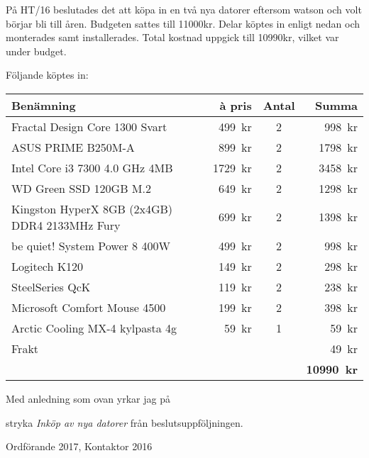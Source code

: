\documentclass[../_main/handlingar.tex]{subfiles}
\begin{document}
På HT/16 beslutades det att köpa in en två nya datorer eftersom watson och volt börjar bli till åren. Budgeten sattes till 11000kr. Delar köptes in enligt nedan och monterades samt installerades. Total kostnad uppgick till 10990kr, vilket var under budget.

Följande köptes in:
\begin{table}[H]
\begin{tabular}{lrcr}
    \textbf{Benämning} & \textbf{\`a pris} & \textbf{Antal} & \textbf{Summa} \\
    \hline
    Fractal Design Core 1300 Svart & \SI{499}{kr} & 2 & \SI{998}{kr} \\
    ASUS PRIME B250M-A & \SI{899}{kr} & 2 & \SI{1798}{kr} \\
    Intel Core i3 7300 4.0 GHz 4MB & \SI{1729}{kr} & 2 & \SI{3458}{kr} \\
    WD Green SSD 120GB M.2 & \SI{649}{kr} & 2 & \SI{1298}{kr} \\
    Kingston HyperX 8GB (2x4GB) DDR4 2133MHz Fury & \SI{699}{kr} & 2 & \SI{1398}{kr} \\
    be quiet! System Power 8 400W & \SI{499}{kr} & 2 & \SI{998}{kr} \\
    Logitech K120 & \SI{149}{kr} & 2 & \SI{298}{kr} \\
    SteelSeries QcK & \SI{119}{kr} & 2 & \SI{238}{kr} \\
    Microsoft Comfort Mouse 4500 & \SI{199}{kr} & 2 & \SI{398}{kr} \\
    Arctic Cooling MX-4 kylpasta 4g & \SI{59}{kr} & 1 & \SI{59}{kr} \\
    Frakt & & & \SI{49}{kr}\\
    \hline
    & & & \textbf{\SI{10990}{kr}}\\
\end{tabular}
\end{table}

Med anledning som ovan yrkar jag på

\begin{attsatser}
    \att stryka \emph{Inköp av nya datorer} från beslutsuppföljningen.
\end{attsatser}

\begin{signatures}{1}
    \mvh
    \signature{Erik Månsson}{Ordförande 2017, Kontaktor 2016}
\end{signatures}
\end{document}
